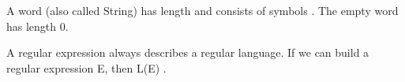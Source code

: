 \documentclass[10pt,a4paper,english]{article}
\author{Tim Schlachter (7039326)}
\begin{document}
    \maketitle

    \newpage
    \tableofcontents
    \newpage

    A word \word (also called String) has length \length and consists of symbols \symbol \elem \sigmaS. \newline
    The empty word \emptyword has length 0. \newline


    \newpage


    \newpage
    A regular expression always describes a regular language. If we can build a regular expression E, then L(E) \elem \REG. \newline


    \newpage



    \newpage

    \newpage
    \printindex
\end{document}
